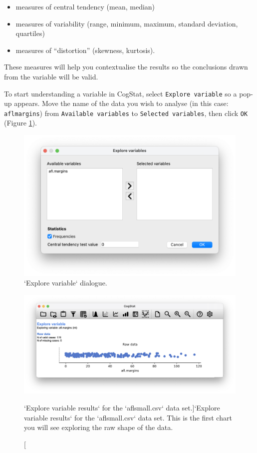 \documentclass[
]{book}
\providecommand{\tightlist}{%
  \setlength{\itemsep}{0pt}\setlength{\parskip}{0pt}}
\theoremstyle{definition}
\theoremstyle{definition}
\theoremstyle{definition}
\theoremstyle{definition}
\theoremstyle{remark}
\begin{document}
\begin{itemize}
\tightlist
\item
  measures of central tendency (mean, median)
\item
  measures of variability (range, minimum, maximum, standard deviation, quartiles)
\item
  measures of ``distortion'' (skewness, kurtosis).
\end{itemize}

These measures will help you contextualise the results so the conclusions drawn from the variable will be valid.

To start understanding a variable in CogStat, select \texttt{Explore\ variable} so a pop-up appears. Move the name of the data you wish to analyse (in this case: \texttt{aflmargins}) from \texttt{Available\ variables} to \texttt{Selected\ variables}, then click \texttt{OK} (Figure \ref{fig:explorevariabledialog}).

\begin{figure}

{\centering \includegraphics[width=0.66\linewidth]{resources/image/explorevariable} 

}

\caption{`Explore variable` dialogue.}\label{fig:explorevariabledialog}
\end{figure}

\begin{figure}

{\centering \includegraphics[width=0.66\linewidth]{resources/image/cogstatrawaflsmall} 

}

\caption[`Explore variable results` for the `aflsmall.csv` data set.]{`Explore variable results` for the `aflsmall.csv` data set. This is the first chart you will see exploring the raw shape of the data.}\label{fig:rawaflsmall}
\end{figure}
\end{document}
